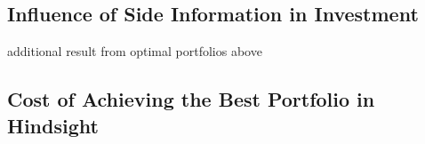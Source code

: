 \documentclass[10pt, twocolumn]{IEEEtran}
\begin{document}
\subsection{Influence of Side Information in Investment}
additional result from optimal portfolios above
\subsection{Cost of Achieving the Best Portfolio in Hindsight}









 
\baselineskip=2pt


\end{document}
